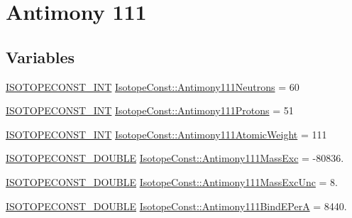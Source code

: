 \hypertarget{group___isotope_const-_antimony-_sb111}{}\section{Antimony 111}
\label{group___isotope_const-_antimony-_sb111}
\subsection*{Variables}
\begin{DoxyCompactItemize}
\item 
\mbox{\hyperlink{group___isotope_const-_macros_ga5f18360b3e99483a35c32d789e62621c}{I\+S\+O\+T\+O\+P\+E\+C\+O\+N\+S\+T\+\_\+\+I\+NT}} \mbox{\hyperlink{group___isotope_const-_antimony-_sb111_ga6eb1f0bec9076d45c9d559551d5ceef4}{Isotope\+Const\+::\+Antimony111\+Neutrons}} = 60
\item 
\mbox{\hyperlink{group___isotope_const-_macros_ga5f18360b3e99483a35c32d789e62621c}{I\+S\+O\+T\+O\+P\+E\+C\+O\+N\+S\+T\+\_\+\+I\+NT}} \mbox{\hyperlink{group___isotope_const-_antimony-_sb111_ga5da1771d61ac60ffc70e851743c79c0a}{Isotope\+Const\+::\+Antimony111\+Protons}} = 51
\item 
\mbox{\hyperlink{group___isotope_const-_macros_ga5f18360b3e99483a35c32d789e62621c}{I\+S\+O\+T\+O\+P\+E\+C\+O\+N\+S\+T\+\_\+\+I\+NT}} \mbox{\hyperlink{group___isotope_const-_antimony-_sb111_gac936cd04793e9fc9a750ecf134638c95}{Isotope\+Const\+::\+Antimony111\+Atomic\+Weight}} = 111
\item 
\mbox{\hyperlink{group___isotope_const-_macros_ga8f45a7272ce02c0b4c65c44636ed719a}{I\+S\+O\+T\+O\+P\+E\+C\+O\+N\+S\+T\+\_\+\+D\+O\+U\+B\+LE}} \mbox{\hyperlink{group___isotope_const-_antimony-_sb111_ga917f7daf451c0db4d7d1668861325ff3}{Isotope\+Const\+::\+Antimony111\+Mass\+Exc}} = -\/80836.
\item 
\mbox{\hyperlink{group___isotope_const-_macros_ga8f45a7272ce02c0b4c65c44636ed719a}{I\+S\+O\+T\+O\+P\+E\+C\+O\+N\+S\+T\+\_\+\+D\+O\+U\+B\+LE}} \mbox{\hyperlink{group___isotope_const-_antimony-_sb111_ga768194bd39a807edbee19ece25e6f7cb}{Isotope\+Const\+::\+Antimony111\+Mass\+Exc\+Unc}} = 8.
\item 
\mbox{\hyperlink{group___isotope_const-_macros_ga8f45a7272ce02c0b4c65c44636ed719a}{I\+S\+O\+T\+O\+P\+E\+C\+O\+N\+S\+T\+\_\+\+D\+O\+U\+B\+LE}} \mbox{\hyperlink{group___isotope_const-_antimony-_sb111_ga36a910fd8ad2a5274db6572fedcc3919}{Isotope\+Const\+::\+Antimony111\+Bind\+E\+PerA}} = 8440.
\item 

\end{DoxyCompactItemize}
